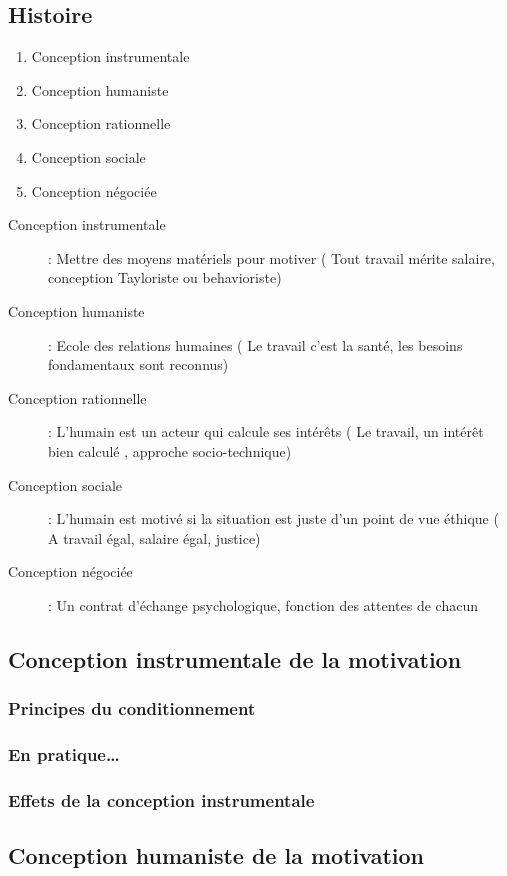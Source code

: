 \documentclass[12pt]{article}
\begin{document}
	\subsection{Histoire}
	\begin{enumerate}
		\item Conception instrumentale
		\item Conception humaniste
		\item Conception rationnelle
		\item Conception sociale
		\item Conception négociée
	\end{enumerate}

	\begin{description}
		\item[Conception instrumentale] : Mettre des moyens matériels pour motiver (\og{} Tout travail mérite salaire\fg{}, conception Tayloriste ou behavioriste)
		\item[Conception humaniste] : Ecole des relations humaines (\og{} Le travail c'est la santé\fg{}, les besoins fondamentaux sont reconnus)
		\item[Conception rationnelle] : L'humain est un acteur qui calcule ses intérêts (\og{} Le travail, un intérêt bien calculé\fg{} , approche socio-technique)
		\item[Conception sociale] : L'humain est motivé si la situation est juste d'un point de vue éthique (\og{} A travail égal, salaire égal\fg{}, justice)
		\item[Conception négociée] : Un contrat d'échange psychologique, fonction des attentes de chacun
	\end{description}
	\subsection{Conception instrumentale de la motivation}
		\subsubsection{Principes du conditionnement}
		\subsubsection{En pratique…}
		\subsubsection{Effets de la conception instrumentale}
	\subsection{Conception humaniste de la motivation}
\end{document}
